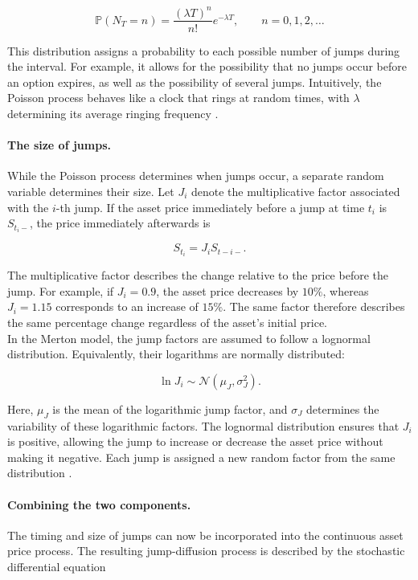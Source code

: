 \documentclass{article}
\begin{document}
	\[
	\mathbb{P}(N_T = n) = \frac{(\lambda T)^n}{n!}e^{-\lambda T}, \qquad n=0,1,2,\ldots
	\] 
	
	This distribution assigns a probability to each possible number of jumps during the interval. For example, it allows for the possibility that no jumps occur before an option expires, as well as the possibility of several jumps. Intuitively, the Poisson process behaves like a clock that rings at random times, with $\lambda$ determining its average ringing frequency \cite{joshi}.
	
	\paragraph{The size of jumps.}
	
	While the Poisson process determines when jumps occur, a separate random variable determines their size. Let $J_i$ denote the multiplicative factor associated with the $i$-th jump. If the asset price immediately before a jump at time $t_i$ is $S_{t_i-}$, the price immediately afterwards is
	
	\[
	S_{t_i}=J_iS_{t-i-}.
	\]
	
	The multiplicative factor describes the change relative to the price before the jump. For example, if $J_i=0.9$, the asset price decreases by $10\%$, whereas $J_i = 1.15$ corresponds to an increase of $15\%$. The same factor therefore describes the same percentage change regardless of the asset's initial price. \\
	In the Merton model, the jump factors are assumed to follow a lognormal distribution. Equivalently, their logarithms are normally distributed:
	
	\[
	\ln J_i \sim\mathcal{N}(\mu_J,\sigma_J^2).
	\]
	
	Here, $\mu_J$ is the mean of the logarithmic jump factor, and $\sigma_J$ determines the variability of these logarithmic factors. The lognormal distribution ensures that $J_i$ is positive, allowing the jump to increase or decrease the asset price without making it negative. Each jump is assigned a new random factor from the same distribution \cite{joshi}.
	
	\paragraph{Combining the two components.}
	
	The timing and size of jumps can now be incorporated into the continuous asset price process. The resulting jump-diffusion process is described by the stochastic differential equation
	
\end{document}
